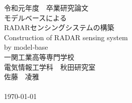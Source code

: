 \begin{center}
    {\Large 令和元年度　卒業研究論文} \\[3.5truecm]
    \huge モデルベースによる\\RADARセンシングシステムの構築 \\
    \LARGE Construction of RADAR sensing system\\by model‐base\\[4truecm]
    \Large 一関工業高等専門学校\\
    電気情報工学科　秋田研究室\\
    佐藤　凌雅\\
    　\\
    \today
\end{center}